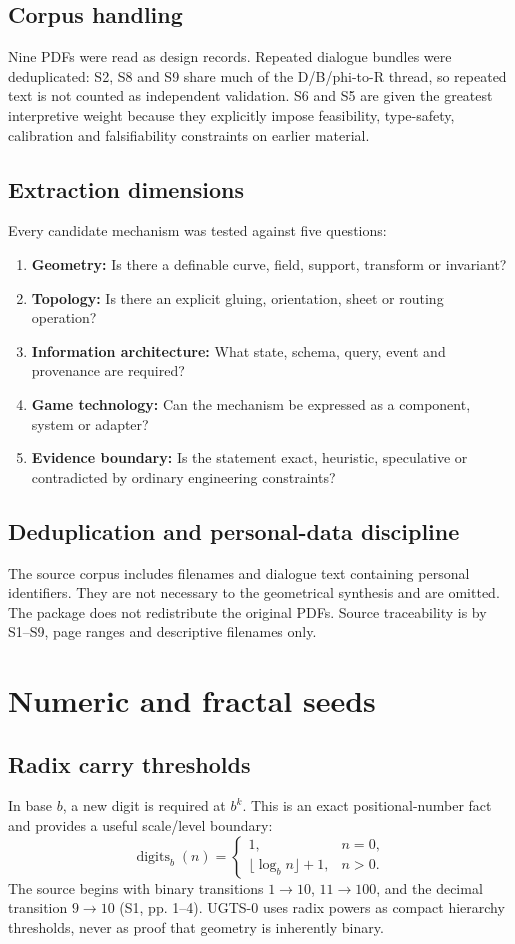 \documentclass[10.5pt,a4paper,openany]{book}
\newcommand{\statusretain}{\tcbox[on line,boxsep=1pt,left=3pt,right=3pt,top=1pt,bottom=1pt,arc=2pt,colback=UGTSTeal,colframe=UGTSTeal,coltext=white,fontupper=\sffamily\bfseries\scriptsize]{RETAIN}}
\begin{document}
\section{Corpus handling}
Nine PDFs were read as design records. Repeated dialogue bundles were deduplicated: S2, S8 and S9 share much of the D/B/phi-to-R thread, so repeated text is not counted as independent validation. S6 and S5 are given the greatest interpretive weight because they explicitly impose feasibility, type-safety, calibration and falsifiability constraints on earlier material.



\section{Extraction dimensions}
Every candidate mechanism was tested against five questions:
\begin{enumerate}
\item \textbf{Geometry:} Is there a definable curve, field, support, transform or invariant?
\item \textbf{Topology:} Is there an explicit gluing, orientation, sheet or routing operation?
\item \textbf{Information architecture:} What state, schema, query, event and provenance are required?
\item \textbf{Game technology:} Can the mechanism be expressed as a component, system or adapter?
\item \textbf{Evidence boundary:} Is the statement exact, heuristic, speculative or contradicted by ordinary engineering constraints?
\end{enumerate}

\section{Deduplication and personal-data discipline}
The source corpus includes filenames and dialogue text containing personal identifiers. They are not necessary to the geometrical synthesis and are omitted. The package does not redistribute the original PDFs. Source traceability is by S1--S9, page ranges and descriptive filenames only.

\chapter{Numeric and fractal seeds}
\section{Radix carry thresholds}
\statusretain\quad In base $b$, a new digit is required at $b^k$. This is an exact positional-number fact and provides a useful scale/level boundary:
\[
\operatorname{digits}_b(n)=\begin{cases}1,&n=0,\\ \lfloor\log_b n\rfloor+1,&n>0.\end{cases}
\]
The source begins with binary transitions $1\to10$, $11\to100$, and the decimal transition $9\to10$ (S1, pp. 1--4). UGTS-0 uses radix powers as compact hierarchy thresholds, never as proof that geometry is inherently binary.
\end{document}
